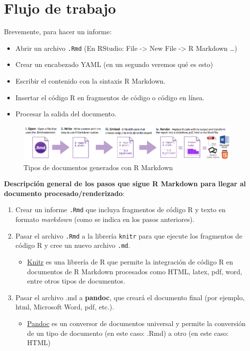 \documentclass[
]{book}
\providecommand{\tightlist}{%
  \setlength{\itemsep}{0pt}\setlength{\parskip}{0pt}}
\begin{document}
\hypertarget{flujo-de-trabajo}{%
\section{Flujo de trabajo}\label{flujo-de-trabajo}}

Brevemente, para hacer un informe:

\begin{itemize}
\tightlist
\item
  Abrir un archivo \texttt{.Rmd} (En RStudio: File -\textgreater{} New File -\textgreater{} R Markdown \ldots)
\item
  Crear un encabezado YAML (en un segundo veremos qué es esto)
\item
  Escribir el contenido con la sintaxis R Markdown.
\item
  Insertar el código R en fragmentos de código o código en línea.
\item
  Procesar la salida del documento.
\end{itemize}

\begin{figure}
\centering
\includegraphics{figures/workflow_rmarkdown.png}
\caption{Tipos de documentos generados con R Markdown}
\end{figure}

\textbf{Descripción general de los pasos que sigue R Markdown para llegar al documento procesado/renderizado}:

\begin{enumerate}
\def\labelenumi{\arabic{enumi}.}
\tightlist
\item
  Crear un informe \texttt{.Rmd} que incluya fragmentos de código R y texto en formato \emph{markdown} (como se indica en los pasos anteriores).
\item
  Pasar el archivo \texttt{.Rmd} a la librería \texttt{knitr} para que ejecute los fragmentos de código R y cree un nuevo archivo \texttt{.md}.

  \begin{itemize}
  \tightlist
  \item
    \href{https://yihui.org/knitr/}{Knitr} es una librería de R que permite la integración de código R en documentos de R Markdown procesados como HTML, latex, pdf, word, entre otros tipos de documentos.
  \end{itemize}
\item
  Pasar el archivo .md a \textbf{pandoc}, que creará el documento final (por ejemplo, html, Microsoft Word, pdf, etc.).

  \begin{itemize}
  \tightlist
  \item
    \href{https://pandoc.org/}{Pandoc} es un conversor de documentos universal y permite la conversión de un tipo de documento (en este caso: .Rmd) a otro (en este caso: HTML)
  \end{itemize}
\end{enumerate}
\end{document}
